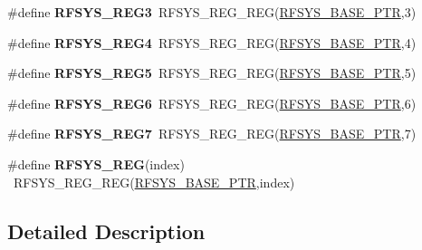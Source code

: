 \begin{DoxyCompactItemize}
\item 
\hypertarget{group___r_f_s_y_s___register___accessor___macros_ga66bdcfc079cddd40f67493cf57742ec4}{}\#define {\bfseries R\+F\+S\+Y\+S\+\_\+\+R\+E\+G3}~R\+F\+S\+Y\+S\+\_\+\+R\+E\+G\+\_\+\+R\+E\+G(\hyperlink{group___r_f_s_y_s___peripheral_ga2dab66eae1abcaf22879dbce661ea2fa}{R\+F\+S\+Y\+S\+\_\+\+B\+A\+S\+E\+\_\+\+P\+T\+R},3)\label{group___r_f_s_y_s___register___accessor___macros_ga66bdcfc079cddd40f67493cf57742ec4}

\item 
\hypertarget{group___r_f_s_y_s___register___accessor___macros_ga8f8a2de06cf7074438ebea8a462951ca}{}\#define {\bfseries R\+F\+S\+Y\+S\+\_\+\+R\+E\+G4}~R\+F\+S\+Y\+S\+\_\+\+R\+E\+G\+\_\+\+R\+E\+G(\hyperlink{group___r_f_s_y_s___peripheral_ga2dab66eae1abcaf22879dbce661ea2fa}{R\+F\+S\+Y\+S\+\_\+\+B\+A\+S\+E\+\_\+\+P\+T\+R},4)\label{group___r_f_s_y_s___register___accessor___macros_ga8f8a2de06cf7074438ebea8a462951ca}

\item 
\hypertarget{group___r_f_s_y_s___register___accessor___macros_gae851bc5789c9c81d359e77dd56f7ae08}{}\#define {\bfseries R\+F\+S\+Y\+S\+\_\+\+R\+E\+G5}~R\+F\+S\+Y\+S\+\_\+\+R\+E\+G\+\_\+\+R\+E\+G(\hyperlink{group___r_f_s_y_s___peripheral_ga2dab66eae1abcaf22879dbce661ea2fa}{R\+F\+S\+Y\+S\+\_\+\+B\+A\+S\+E\+\_\+\+P\+T\+R},5)\label{group___r_f_s_y_s___register___accessor___macros_gae851bc5789c9c81d359e77dd56f7ae08}

\item 
\hypertarget{group___r_f_s_y_s___register___accessor___macros_ga1fec8a3f3c899d0e91a212d5d8d60e0e}{}\#define {\bfseries R\+F\+S\+Y\+S\+\_\+\+R\+E\+G6}~R\+F\+S\+Y\+S\+\_\+\+R\+E\+G\+\_\+\+R\+E\+G(\hyperlink{group___r_f_s_y_s___peripheral_ga2dab66eae1abcaf22879dbce661ea2fa}{R\+F\+S\+Y\+S\+\_\+\+B\+A\+S\+E\+\_\+\+P\+T\+R},6)\label{group___r_f_s_y_s___register___accessor___macros_ga1fec8a3f3c899d0e91a212d5d8d60e0e}

\item 
\hypertarget{group___r_f_s_y_s___register___accessor___macros_gaf25af9e067ebffe9129b6fb10078aa85}{}\#define {\bfseries R\+F\+S\+Y\+S\+\_\+\+R\+E\+G7}~R\+F\+S\+Y\+S\+\_\+\+R\+E\+G\+\_\+\+R\+E\+G(\hyperlink{group___r_f_s_y_s___peripheral_ga2dab66eae1abcaf22879dbce661ea2fa}{R\+F\+S\+Y\+S\+\_\+\+B\+A\+S\+E\+\_\+\+P\+T\+R},7)\label{group___r_f_s_y_s___register___accessor___macros_gaf25af9e067ebffe9129b6fb10078aa85}

\item 
\hypertarget{group___r_f_s_y_s___register___accessor___macros_ga9328c493cbb46c6f0ec13604fee90f60}{}\#define {\bfseries R\+F\+S\+Y\+S\+\_\+\+R\+E\+G}(index)                                              ~R\+F\+S\+Y\+S\+\_\+\+R\+E\+G\+\_\+\+R\+E\+G(\hyperlink{group___r_f_s_y_s___peripheral_ga2dab66eae1abcaf22879dbce661ea2fa}{R\+F\+S\+Y\+S\+\_\+\+B\+A\+S\+E\+\_\+\+P\+T\+R},index)\label{group___r_f_s_y_s___register___accessor___macros_ga9328c493cbb46c6f0ec13604fee90f60}

\end{DoxyCompactItemize}


\subsection{Detailed Description}
